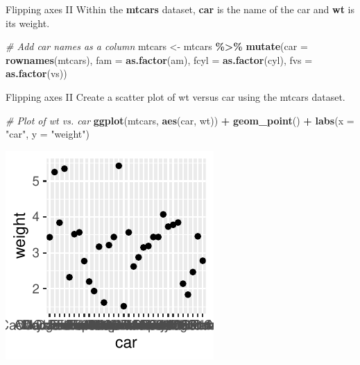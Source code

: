 \documentclass[
  ignorenonframetext,
]{beamer}
\newenvironment{Shaded}{\begin{snugshade}}{\end{snugshade}}
\newcommand{\AttributeTok}[1]{\textcolor[rgb]{0.13,0.29,0.53}{#1}}
\newcommand{\CommentTok}[1]{\textcolor[rgb]{0.56,0.35,0.01}{\textit{#1}}}
\newcommand{\FunctionTok}[1]{\textcolor[rgb]{0.13,0.29,0.53}{\textbf{#1}}}
\newcommand{\NormalTok}[1]{#1}
\newcommand{\OtherTok}[1]{\textcolor[rgb]{0.56,0.35,0.01}{#1}}
\newcommand{\SpecialCharTok}[1]{\textcolor[rgb]{0.81,0.36,0.00}{\textbf{#1}}}
\newcommand{\StringTok}[1]{\textcolor[rgb]{0.31,0.60,0.02}{#1}}
\begin{document}
\begin{frame}[fragile]{Flipping axes II}
\label{flipping-axes-ii-1}
Within the \textbf{mtcars} dataset, \textbf{car} is the name of the car
and \textbf{wt} is its weight.


\begin{Shaded}
\begin{Highlighting}[]
\CommentTok{\# Add car names as a column}
\NormalTok{mtcars }\OtherTok{\textless{}{-}}\NormalTok{ mtcars }\SpecialCharTok{\%\textgreater{}\%}
    \FunctionTok{mutate}\NormalTok{(}\AttributeTok{car =} \FunctionTok{rownames}\NormalTok{(mtcars), }\AttributeTok{fam =} \FunctionTok{as.factor}\NormalTok{(am), }\AttributeTok{fcyl =} \FunctionTok{as.factor}\NormalTok{(cyl),}
        \AttributeTok{fvs =} \FunctionTok{as.factor}\NormalTok{(vs))}
\end{Highlighting}
\end{Shaded}
\end{frame}

\begin{frame}[fragile]{Flipping axes II}
\label{flipping-axes-ii-2}
Create a scatter plot of wt versus car using the mtcars dataset.


\begin{Shaded}
\begin{Highlighting}[]
\CommentTok{\# Plot of wt vs. car}
\FunctionTok{ggplot}\NormalTok{(mtcars, }\FunctionTok{aes}\NormalTok{(car, wt)) }\SpecialCharTok{+} \FunctionTok{geom\_point}\NormalTok{() }\SpecialCharTok{+} \FunctionTok{labs}\NormalTok{(}\AttributeTok{x =} \StringTok{"car"}\NormalTok{,}
    \AttributeTok{y =} \StringTok{"weight"}\NormalTok{)}
\end{Highlighting}
\end{Shaded}

\begin{center}\includegraphics[width=0.5\linewidth]{Figs/unnamed-chunk-63-1} \end{center}
\end{frame}
\end{document}
